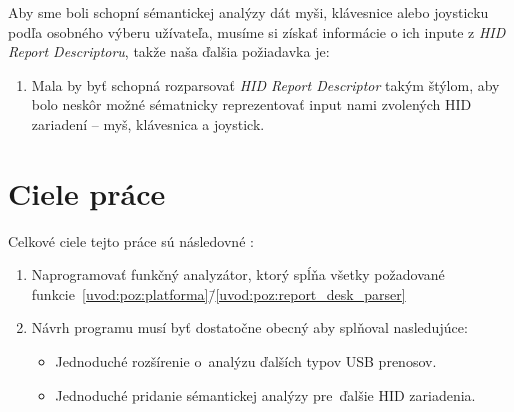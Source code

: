 Aby sme boli schopní sémantickej analýzy dát myši, klávesnice alebo joysticku podľa osobného výberu užívateľa, musíme si získať informácie o ich inpute z \textit{HID Report Descriptoru}, takže naša ďalšia požiadavka je:
\begin{enumerate}[label=\textbf{P\arabic*},resume]
	\item \label{uvod:poz:report_desk_parser} Mala by byť schopná rozparsovať \textit{HID Report Descriptor} takým štýlom, aby bolo neskôr možné sématnicky reprezentovať input nami zvolených HID zariadení -- myš, klávesnica a joystick.
\end{enumerate}

\section{Ciele práce}

Celkové ciele tejto práce sú následovné :

\begin{enumerate}[label=\textbf{C\arabic*}]
	\item \label{uvod:ciel:aplikacia} Naprogramovať funkčný analyzátor, ktorý spĺňa všetky požadované funkcie~\ref{uvod:poz:platforma}\=/\ref{uvod:poz:report_desk_parser}
	\item \label{uvod:ciel:rozsiritelnost} Návrh programu musí byť dostatočne obecný aby splňoval nasledujúce:
	\begin{itemize}
		\item \label{uvod:ciel:roz_USB} Jednoduché rozšírenie o~analýzu ďalších typov USB prenosov.
		\item \label{uvod:ciel:roz_HID} Jednoduché pridanie sémantickej analýzy pre~ďalšie HID zariadenia.
	\end{itemize}
\end{enumerate}